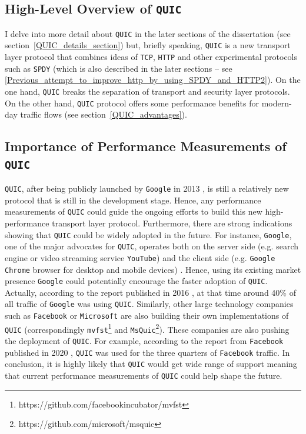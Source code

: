 \documentclass[12pt,a4paper,twoside,openright]{report}
\begin{document}
 

\subsection{High-Level Overview of \texttt{QUIC}}
I delve into more detail about \texttt{QUIC} in the later sections of the dissertation (see section~\ref{QUIC_details_section}) but, briefly speaking, \texttt{QUIC} is a new transport layer protocol that combines ideas of \texttt{TCP}, \texttt{HTTP} and other experimental protocols such as \texttt{SPDY} (which is also described in the later sections -- see \ref{Previous_attempt_to_improve_http_by_using_SPDY_and_HTTP2}).
On the one hand, \texttt{QUIC} breaks the separation of transport and security layer protocols. 
On the other hand, \texttt{QUIC} protocol offers some performance benefits for modern-day traffic flows (see section~\ref{QUIC_advantages}).


\subsection{Importance of Performance Measurements of \texttt{QUIC}}

\texttt{QUIC}, after being publicly launched by \texttt{Google} in 2013 \cite{Chromium_Blog_Experimenting_with_quic},  is still a relatively new protocol that is still in the development stage.
Hence, any performance measurements of \texttt{QUIC} could guide the ongoing efforts to build this new high-performance transport layer protocol.
Furthermore, there are strong indications showing that \texttt{QUIC} could be widely adopted in the future.
For instance, \texttt{Google}, one of the major advocates for \texttt{QUIC}, operates both on the server side (e.g. search engine or video streaming service \texttt{YouTube}) and the client side (e.g. \texttt{Google Chrome} browser for desktop and mobile devices) \cite{A_QUICk_Introduction_to_HTTP3}.
Hence, using its existing market presence \texttt{Google} could potentially encourage the faster adoption of \texttt{QUIC}.
Actually, according to the report published in 2016 \cite{RuthJan2018AFLa}, at that time around 40\% of all traffic of \texttt{Google} was using \texttt{QUIC}.
Similarly, other large technology companies such as \texttt{Facebook} or \texttt{Microsoft} are also building their own implementations of \texttt{QUIC} (correspondingly \texttt{mvfst}\footnote{https://github.com/facebookincubator/mvfst} and \texttt{MsQuic}\footnote{https://github.com/microsoft/msquic}).
These companies are also pushing the deployment of \texttt{QUIC}. 
For example, according to the report from \texttt{Facebook} published in 2020 \cite{how-facebook-is-bringing-quic-to-billions}, \texttt{QUIC} was used for the three quarters of \texttt{Facebook} traffic. 
In conclusion, it is highly likely that \texttt{QUIC} would get wide range of support meaning that current performance measurements of \texttt{QUIC} could help shape the future.
\end{document}
